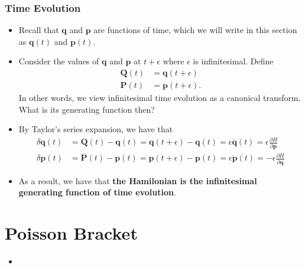 \documentclass[10pt]{article}
\newcommand{\ve}[1]{\mathbf{#1}}
\begin{document}
  \subsubsection{Time Evolution}

  \begin{itemize}
    \item Recall that $\ve{q}$ and $\ve{p}$ are functions of time, which we will write in this section as $\ve{q}(t)$ and $\ve{p}(t)$.

    \item Consider the values of $\ve{q}$ and $\ve{p}$ at $t + \epsilon$ where $\epsilon$ is infinitesimal. Define
    \begin{align*}
      \ve{Q}(t) &= \ve{q}(t + \epsilon) \\
      \ve{P}(t) &= \ve{p}(t + \epsilon).
    \end{align*}
    In other words, we view infinitesimal time evolution as a canonical transform. What is its generating function then?

    \item By Taylor's series expansion, we have that
    \begin{align*}
      \delta \ve{q}(t) 
      &= \ve{Q}(t) - \ve{q}(t)
      = \ve{q}(t + \epsilon) - \ve{q}(t)
      = \epsilon \dot{\ve{q}}(t)
      = \epsilon \frac{\partial H}{\partial \ve{p}} \\
      \delta \ve{p}(t)
      &= \ve{P}(t) - \ve{p}(t)
      = \ve{p}(t + \epsilon) - \ve{p}(t)
      = \epsilon \dot{\ve{p}}(t)
      = -\epsilon \frac{\partial H}{\partial \ve{q}}
    \end{align*}

    \item As a result, we have that {\bf the Hamilonian is the infinitesimal generating function of time evolution}.
  \end{itemize}

  \section{Poisson Bracket}

  \begin{itemize}
    \item 
  \end{itemize}
  
    
\end{document}
